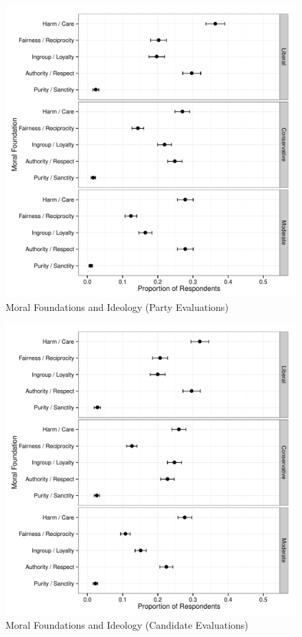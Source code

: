 \documentclass[12pt]{paper}
\begin{document}
\begin{figure}\centering
\includegraphics[scale=.55]{../calc/fig/p2_mft_ideol_pa.pdf}
\caption{Moral Foundations and Ideology (Party Evaluations)}\label{fig:mft_ideol_pa}
\end{figure}

\begin{figure}\centering
\includegraphics[scale=.55]{../calc/fig/p3_mft_ideol_ca.pdf}
\caption{Moral Foundations and Ideology (Candidate Evaluations)}\label{fig:mft_ideol_ca}
\end{figure}
\end{document}
